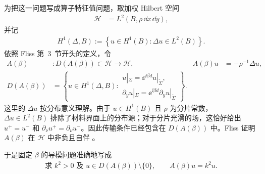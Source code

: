 为把这一问题写成算子特征值问题，取加权 Hilbert 空间
\begin{align}
  \mathcal H&=L^2(B,\rho\,\dd x\,\dd y),
  \label{eq:weighted-hilbert-space}
\end{align}
并记
\begin{align}
  H^1(\Delta,B)
  :=\left\{u\in H^1(B):\Delta u\in L^2(B)\right\}.
  \label{eq:H1-Delta}
\end{align}
依照 Fliss 第~3~节开头的定义，令
\begin{equation}
  \begin{aligned}
    A(\beta)&:D(A(\beta))\subset\mathcal H\longrightarrow\mathcal H,
    &
    A(\beta)u&=-\rho^{-1}\Delta u,\\
    D(A(\beta))
    &=\left\{u\in H^1(\Delta,B):
    \begin{array}{l}
      u|_\Sigma=\ee^{\ii\beta d}u|_{\widetilde\Sigma},\\[-1mm]
      \partial_yu|_\Sigma
      =\ee^{\ii\beta d}\partial_yu|_{\widetilde\Sigma}
    \end{array}\right\}.
  \end{aligned}
  \label{eq:fixed-beta-operator}
\end{equation}
这里的 $\Delta u$ 按分布意义理解。由于 $u\in H^1(B)$ 且 $\rho$ 为分片常数，
$\Delta u\in L^2(B)$ 排除了材料界面上的分布源；对于分片光滑的场，这恰好给出
$u^+=u^-$ 和 $\partial_\nu u^+=\partial_\nu u^-$。因此传输条件已经包含在
$D(A(\beta))$ 中。Fliss 证明 $A(\beta)$ 在 $\mathcal H$ 中非负且自伴
\cite[第~3~节及命题~3.1]{Fliss2013}。

于是固定 $\beta$ 的导模问题准确地写成
\begin{align}
  \text{求 }k^2>0\text{ 及 }u\in D(A(\beta))\setminus\{0\},
  \qquad A(\beta)u=k^2u.
  \label{eq:beta-formulation}
\end{align}

